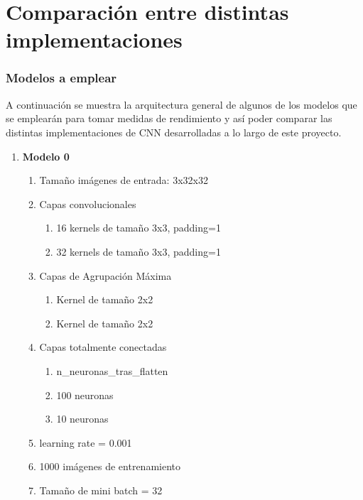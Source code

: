 \chapter{Comparación entre distintas implementaciones}

\subsection{Modelos a emplear}

A continuación se muestra la arquitectura general de algunos de los modelos que se emplearán para tomar medidas de rendimiento y así poder comparar las distintas implementaciones de CNN desarrolladas a lo largo de este proyecto.

\begin{enumerate}
	\item \textbf{Modelo 0}
	\begin{enumerate}[label=\textbullet, nosep]
		\item Tamaño imágenes de entrada: 3x32x32
		\item Capas convolucionales
			\begin{enumerate}[label=\textbullet, nosep]
				\item 16 kernels de tamaño 3x3, padding=1
				\item 32 kernels de tamaño 3x3, padding=1
			\end{enumerate}
		\item Capas de Agrupación Máxima
		\begin{enumerate}[label=\textbullet, nosep]
			\item Kernel de tamaño 2x2
			\item Kernel de tamaño 2x2
		\end{enumerate}
		\item Capas totalmente conectadas
		\begin{enumerate}[label=\textbullet, nosep]
			\item n\_neuronas\_tras\_flatten
			\item 100 neuronas
			\item 10 neuronas
		\end{enumerate}
		\item learning rate = 0.001
		\item 1000 imágenes de entrenamiento
		\item Tamaño de mini batch = 32
	\end{enumerate}
	

\end{enumerate}

